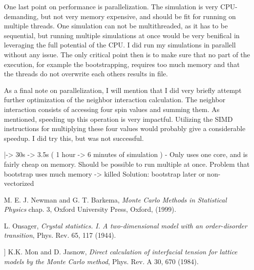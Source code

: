 \documentclass{article}
\begin{document}
One last point on performance is parallelization.
The simulation is very CPU-demanding, but not very memory expensive, and should be fit for running on multiple threads.
One simulation can not be multithreaded, as it has to be sequential, but running multiple simulations at once would be very benifical in leveraging the full potential of the CPU.
I did run my simulations in parallell without any issue.
The only critical point then is to make sure that no part of the execution, for example the bootstrapping, requires too much memory and that the threads do not overwrite each others results in file.



As a final note on parallelization, I will mention that I did very briefly attempt further optimization of the neighbor interaction calculation.
The neighbor interaction consists of accessing four spin values and summing them.
As mentioned, speeding up this operation is very impactful.
Utilizing the SIMD instructions for multiplying these four values would probably give a considerable speedup.
I did try this, but was not successful.

  |-> 30s -> 3.5s ( 1 hour -> 6 minutes of simulation )
- Only uses one core, and is fairly cheap on memory.
  Should be possible to run multiple at once.
  Problem that bootstrap uses much memory -> killed
  Solution: bootstrap later or non-vectorized


\begin{thebibliography}{9}
 M. E. J. Newman and G. T. Barkema, \emph{Monte Carlo Methods in Statistical Physics} chap. 3, Oxford University Press, Oxford, (1999).

  L. Onsager, \emph{Crystal statistics. I. A two-dimensional model with an order-disorder transition},  Phys. Rev. 65, 117 (1944).

 ]  K.K. Mon and D. Jasnow, \emph{Direct calculation of interfacial tension for lattice models by the Monte Carlo method}, Phys. Rev. A 30, 670 (1984). 
\end{thebibliography}
\end{document}
